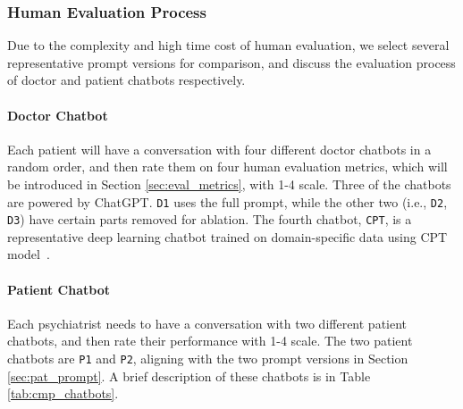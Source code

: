 \subsubsection{Human Evaluation Process}

Due to the complexity and high time cost of human evaluation, we select several representative prompt versions for comparison, and discuss the evaluation process of doctor and patient chatbots respectively.

\paragraph{Doctor Chatbot} 
Each patient will have a conversation with four different doctor chatbots in a random order, and then rate them on four human evaluation metrics, which will be introduced in Section \ref{sec:eval_metrics}, with 1-4 scale. 
Three of the chatbots are powered by ChatGPT. \texttt{D1} uses the full prompt, 
while the other two (i.e., \texttt{D2}, 
\texttt{D3}) have certain parts removed for ablation. 
The fourth chatbot, \texttt{CPT}, is a representative deep learning chatbot trained on domain-specific data \cite{yao-etal-2022-d4} using CPT model~\cite{shao2021cpt}. 
\paragraph{Patient Chatbot}
Each psychiatrist needs to have a conversation with two different patient chatbots, and then rate their performance with 1-4 scale. 
The two patient chatbots are \texttt{P1} and \texttt{P2}, aligning with the two prompt versions in Section \ref{sec:pat_prompt}. 
A brief description of these chatbots is in Table \ref{tab:cmp_chatbots}.

